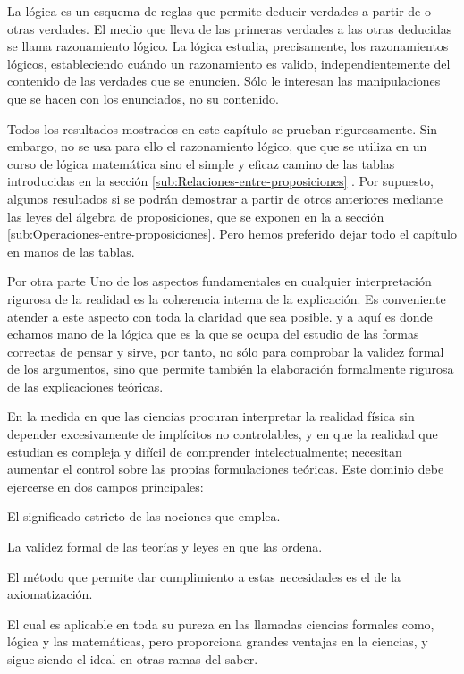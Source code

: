 La lógica es un esquema de reglas que permite deducir verdades a partir
de o otras verdades. El medio que lleva de las primeras verdades a
las otras deducidas se llama razonamiento lógico. La lógica estudia,
precisamente, los razonamientos lógicos, estableciendo cuándo un razonamiento
es valido, independientemente del contenido de las verdades que se
enuncien. Sólo le interesan las manipulaciones que se hacen con los
enunciados, no su contenido.

Todos los resultados mostrados en este capítulo se prueban rigurosamente.
Sin embargo, no se usa para ello el razonamiento lógico, que que se
utiliza en un curso de lógica matemática sino el simple y eficaz camino
de las tablas introducidas en la sección \ref{sub:Relaciones-entre-proposiciones}
. Por supuesto, algunos resultados si se podrán demostrar a partir
de otros anteriores mediante las leyes del álgebra de proposiciones,
que se exponen en la a sección \ref{sub:Operaciones-entre-proposiciones}.
Pero hemos preferido dejar todo el capítulo en manos de las tablas.

Por otra parte Uno de los aspectos fundamentales en cualquier interpretación
rigurosa de la realidad es la coherencia interna de la explicación.
Es conveniente atender a este aspecto con toda la claridad que sea
posible. y a aquí es donde echamos mano de la lógica que es la que
se ocupa del estudio de las formas correctas de pensar y sirve, por
tanto, no sólo para comprobar la validez formal de los argumentos,
sino que permite también la elaboración formalmente rigurosa de las
explicaciones teóricas.

En la medida en que las ciencias procuran interpretar la realidad
física sin depender excesivamente de implícitos no controlables, y
en que la realidad que estudian es compleja y difícil de comprender
intelectualmente; necesitan aumentar el control sobre las propias
formulaciones teóricas. Este dominio debe ejercerse en dos campos
principales: 

El significado estricto de las nociones que emplea. 

La validez formal de las teorías y leyes en que las ordena. 

El método que permite dar cumplimiento a estas necesidades es el de
la axiomatización. 

El cual es aplicable en toda su pureza en las llamadas ciencias formales
como, lógica y las matemáticas, pero proporciona grandes ventajas
en la ciencias, y sigue siendo el ideal en otras ramas del saber.

